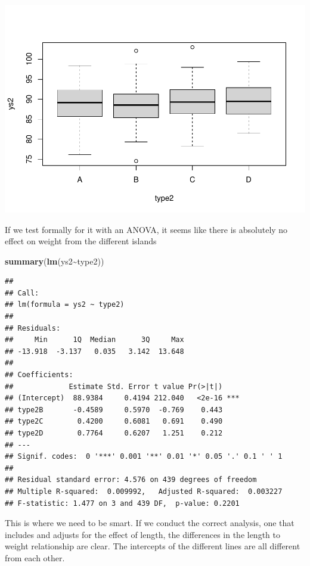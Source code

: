 \documentclass[
]{book}
\newenvironment{Shaded}{\begin{snugshade}}{\end{snugshade}}
\newcommand{\FunctionTok}[1]{\textcolor[rgb]{0.13,0.29,0.53}{\textbf{#1}}}
\newcommand{\NormalTok}[1]{#1}
\newcommand{\SpecialCharTok}[1]{\textcolor[rgb]{0.81,0.36,0.00}{\textbf{#1}}}
\begin{document}
\includegraphics{ECOMODbook_files/figure-latex/a10.12-1.pdf}

If we test formally for it with an ANOVA, it seems like there is absolutely no effect on weight from the different islands

\begin{Shaded}
\begin{Highlighting}[]
\FunctionTok{summary}\NormalTok{(}\FunctionTok{lm}\NormalTok{(ys2}\SpecialCharTok{\textasciitilde{}}\NormalTok{type2))}
\end{Highlighting}
\end{Shaded}

\begin{verbatim}
## 
## Call:
## lm(formula = ys2 ~ type2)
## 
## Residuals:
##     Min      1Q  Median      3Q     Max 
## -13.918  -3.137   0.035   3.142  13.648 
## 
## Coefficients:
##             Estimate Std. Error t value Pr(>|t|)    
## (Intercept)  88.9384     0.4194 212.040   <2e-16 ***
## type2B       -0.4589     0.5970  -0.769    0.443    
## type2C        0.4200     0.6081   0.691    0.490    
## type2D        0.7764     0.6207   1.251    0.212    
## ---
## Signif. codes:  0 '***' 0.001 '**' 0.01 '*' 0.05 '.' 0.1 ' ' 1
## 
## Residual standard error: 4.576 on 439 degrees of freedom
## Multiple R-squared:  0.009992,   Adjusted R-squared:  0.003227 
## F-statistic: 1.477 on 3 and 439 DF,  p-value: 0.2201
\end{verbatim}

This is where we need to be smart. If we conduct the correct analysis, one that includes and adjusts for the effect of length, the differences in the length to weight relationship are clear. The intercepts of the different lines are all different from each other.
\end{document}
